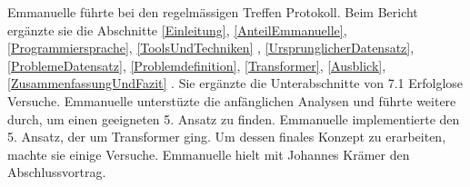 \label{AnteilEmmanuelle}
Emmanuelle führte bei den regelmässigen Treffen Protokoll. 
Beim Bericht ergänzte sie die Abschnitte \ref{Einleitung}, \ref{AnteilEmmanuelle},\ref{Programmiersprache}, \ref{ToolsUndTechniken} , \ref{UrsprunglicherDatensatz}, \ref{ProblemeDatensatz}, \ref{Problemdefinition}, \ref{Transformer}, \ref{Ausblick}, \ref{ZusammenfassungUndFazit}
. %
Sie ergänzte die Unterabschnitte von 7.1 Erfolglose Versuche.
Emmanuelle unterstüzte die anfänglichen Analysen und führte weitere durch, um einen geeigneten 5. Ansatz zu finden.
Emmanuelle implementierte den 5. Ansatz, der um Transformer ging. Um dessen finales Konzept zu erarbeiten, machte sie einige Versuche.
Emmanuelle hielt mit Johannes Krämer den Abschlussvortrag. %

